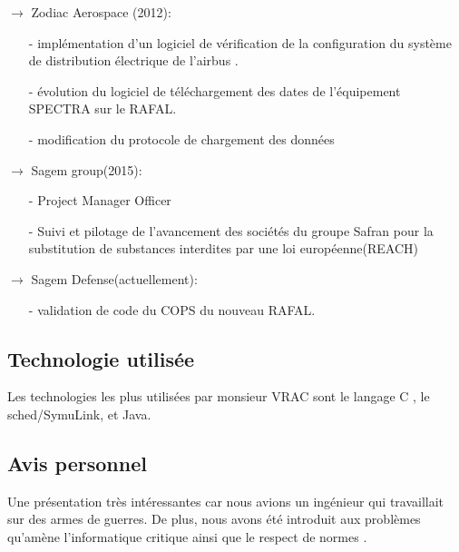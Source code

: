 		$\rightarrow$  Zodiac Aerospace (2012):
		\begin{itemize}
			\item[-] implémentation d'un logiciel de vérification de la configuration du système de distribution électrique de l'airbus .
			\item[-] évolution du logiciel de téléchargement des dates de l'équipement SPECTRA sur le RAFAL. 
			\item[-] modification du protocole de chargement des données 
		\end{itemize}

		$\rightarrow$  Sagem group(2015):
		\begin{itemize}
			\item[-]Project Manager Officer 
			\item[-] Suivi et pilotage de l'avancement des sociétés du groupe Safran pour la substitution de substances interdites par une loi européenne(REACH) 
		\end{itemize}

		$\rightarrow$  Sagem Defense(actuellement):
		\begin{itemize}
			\item[-] validation de code du COPS du nouveau RAFAL.
		\end{itemize}



	\subsection{Technologie utilisée}
	Les technologies les plus utilisées par monsieur VRAC sont le langage C , le sched/SymuLink, et Java.
	\subsection{Avis personnel} 
	Une présentation très intéressantes car nous avions un ingénieur qui travaillait sur des armes de guerres. De plus, nous avons été introduit aux problèmes qu'amène l'informatique critique ainsi que le respect de normes .   